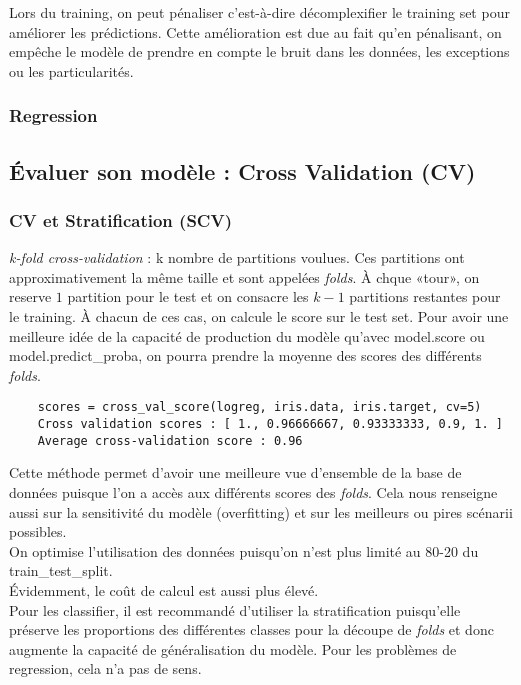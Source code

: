 \documentclass[a4paper,12pt]{report}
\newcommand\bk{\color{black}}
\newcommand\brick{\color{brick}}
\newcommand{\cad}{c'est-à-dire}
\numberwithin{equation}{section} %
\begin{document}
\noindent Lors du training, on peut pénaliser \cad $ $ décomplexifier le training set pour améliorer les prédictions. Cette amélioration est due au fait qu'en pénalisant, on empêche le modèle de prendre en compte le bruit dans les données, les exceptions ou les particularités.
\subsubsection{Regression}
\brick \subsection{Évaluer son modèle : Cross Validation (CV)} \bk
\subsubsection{CV et Stratification (SCV)}
\textit{k-fold cross-validation} : k nombre de partitions voulues. Ces partitions ont approximativement la même taille et sont appelées \textit{folds}. À chque «tour», on reserve $1$ partition pour le test et on consacre les $k-1$ partitions restantes pour le training.
À chacun de ces cas, on calcule le score sur le test set. Pour avoir une meilleure idée de la capacité de production du modèle qu'avec model.score ou model.predict\_proba, on pourra prendre la moyenne des scores des différents \textit{folds}.
\begin{lstlisting}
	scores = cross_val_score(logreg, iris.data, iris.target, cv=5)	
	Cross validation scores : [ 1., 0.96666667, 0.93333333, 0.9, 1. ]	
	Average cross-validation score : 0.96
\end{lstlisting}

\noindent Cette méthode permet d'avoir une meilleure vue d'ensemble de la base de données puisque l'on a accès aux différents scores des \textit{folds}.
Cela nous renseigne aussi sur la sensitivité du modèle (overfitting) et sur les meilleurs ou pires scénarii possibles.\\
On optimise l'utilisation des données puisqu'on n'est plus limité au 80-20 du train\_test\_split.\\
Évidemment, le coût de calcul est aussi plus élevé. \\
Pour les classifier, il est recommandé d'utiliser la stratification puisqu'elle préserve les proportions des différentes classes pour la découpe de \textit{folds} et donc augmente la capacité de généralisation du modèle. Pour les problèmes de regression, cela n'a pas de sens.\\
\end{document}

